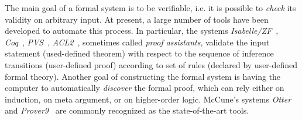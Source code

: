 \documentclass[article]{aaltoseries}
\begin{document}
The main goal of a formal system is to be verifiable, i.e. it is possible to \textit{check} its validity on arbitrary input. At present, a large number of tools have been developed to automate this process. In particular, the systems \textit{Isabelle/ZF}~\cite{tool_Isabelle}, \textit{Coq}~\cite{tool_Coq}, \textit{PVS}~\cite{tool_Pvs}, \textit{ACL2}~\cite{tool_Acl}, sometimes called \textit{proof assistants}, validate the input statement (used-defined theorem) with respect to the sequence of inference transitions (user-defined proof) according to set of rules (declared by user-defined formal theory)\textsl{}.
Another goal of constructing the formal system is having the computer to automatically \textit{discover} the formal proof, which can rely either on induction, on meta argument, or on higher-order logic. McCune’s systems \textit{Otter}~\cite{tool_Otter} and \textit{Prover9}~\cite{tool_Prover9} are commonly recognized as the state-of-the-art tools.
\end{document}
